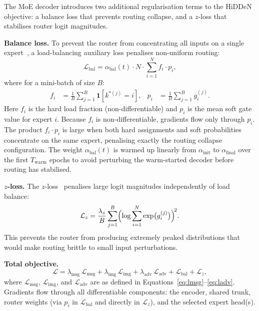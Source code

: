 ﻿\documentclass[12pt, a4paper, twoside]{report}
\numberwithin{equation}{chapter}
\begin{document}
The MoE decoder introduces two additional regularisation terms to the HiDDeN objective: a balance loss that prevents routing collapse, and a $z$-loss that stabilises router logit magnitudes.

\textbf{Balance loss.} To prevent the router from concentrating all inputs on a single expert~\citep{fedus2022}, a load-balancing auxiliary loss penalises non-uniform routing:
\begin{equation}
    \mathcal{L}_\mathrm{bal} = \alpha_\mathrm{bal}(t)\cdot N \cdot \sum_{i=1}^{N} f_i\cdot p_i,
    \label{eq:lbal}
\end{equation}
where for a mini-batch of size $B$:
\begin{align}
    f_i &= \frac{1}{B}\sum_{j=1}^{B} \mathbf{1}\!\left[k^{*(j)} = i\right], &
    p_i &= \frac{1}{B}\sum_{j=1}^{B} g_i^{(j)}.
\end{align}
Here $f_i$ is the hard load fraction (non-differentiable) and $p_i$ is the mean soft gate value for expert $i$. Because $f_i$ is non-differentiable, gradients flow only through $p_i$. The product $f_i\cdot p_i$ is large when both hard assignments and soft probabilities concentrate on the same expert, penalising exactly the routing collapse configuration. The weight $\alpha_\mathrm{bal}(t)$ is warmed up linearly from $\alpha_\mathrm{init}$ to $\alpha_\mathrm{final}$ over the first $T_\mathrm{warm}$ epochs to avoid perturbing the warm-started decoder before routing has stabilised.

\textbf{$z$-loss.} The $z$-loss~\citep{zoph2022} penalises large logit magnitudes independently of load balance:
\begin{equation}
    \mathcal{L}_z = \frac{\lambda_z}{B}\sum_{j=1}^{B}\Bigl(\log\sum_{i=1}^{N}\exp\bigl(g_i^{(j)}\bigr)\Bigr)^{\!2}.
    \label{eq:lz}
\end{equation}
This prevents the router from producing extremely peaked distributions that would make routing brittle to small input perturbations.

\textbf{Total objective.}
\begin{equation}
    \mathcal{L} = \lambda_\mathrm{msg}\,\mathcal{L}_\mathrm{msg} + \lambda_\mathrm{img}\,\mathcal{L}_\mathrm{img} + \lambda_\mathrm{adv}\,\mathcal{L}_\mathrm{adv} + \mathcal{L}_\mathrm{bal} + \mathcal{L}_z,
    \label{eq:ltotal}
\end{equation}
where $\mathcal{L}_\mathrm{msg}$, $\mathcal{L}_\mathrm{img}$, and $\mathcal{L}_\mathrm{adv}$ are as defined in Equations~\eqref{eq:lmsg}--\eqref{eq:ladv}. Gradients flow through all differentiable components: the encoder, shared trunk, router weights (via $p_i$ in $\mathcal{L}_\mathrm{bal}$ and directly in $\mathcal{L}_z$), and the selected expert head(s).
\end{document}
